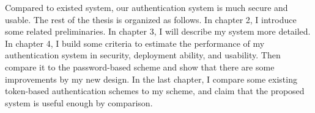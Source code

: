 \begin{CJK}{Bg5}{bsmi}
Compared to existed system, our authentication system is much secure and usable. The rest of the thesis is organized as follows. In chapter 2, I introduce some related preliminaries. In chapter 3, I will describe my system more detailed. In chapter 4, I build some criteria to estimate the performance of my authentication system in security, deployment ability, and usability. Then compare it to the password-based scheme and show that there are some improvements by my new design. In the last chapter, I compare some existing token-based authentication schemes to my scheme, and claim that the proposed system is useful enough by comparison.

\end{CJK}
